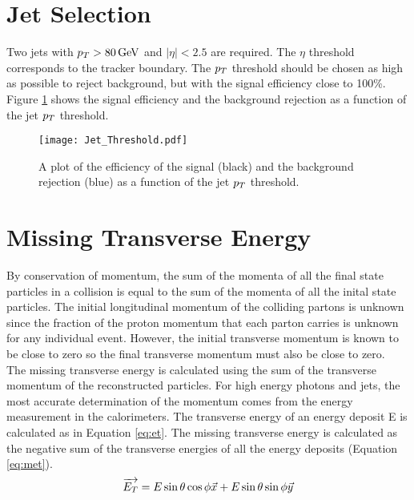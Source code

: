 \section{Jet Selection}

Two jets with $p_{T} > 80 \, \mathrm{GeV}$ and $|\eta| < 2.5$ are required. The $\eta$
threshold corresponds to the tracker boundary. The $p_{T}$ threshold should be
chosen as high as possible to reject background, but with the signal efficiency
close to 100\%. Figure \ref{fig:Jet_Threshold} shows the signal efficiency and 
the background rejection as a function of the jet $p_{T}$ threshold. 

\begin{figure}
\begin{center}
\texttt{[image: Jet\_Threshold.pdf]}
\end{center}
\caption{A plot of the efficiency of the signal (black) and the background
rejection (blue) as a function of the jet $p_{T}$ threshold.}
\label{fig:Jet_Threshold}
\end{figure}

\section{Missing Transverse Energy}
\label{sec:Missing_Transverse_Energy}

By conservation of momentum, the sum of the momenta of all the final state
particles in a collision is equal to the sum of the momenta of all the inital
state particles. The initial longitudinal momentum of the colliding partons is
unknown since the fraction of the proton momentum that each parton carries is
unknown for any individual event. However, the initial transverse momentum is
known to be close to zero so the final transverse momentum must also be close to 
zero. \\

The missing transverse energy is calculated using the sum of the transverse
momentum of the reconstructed particles. For high energy photons and jets, the 
most accurate determination of the momentum comes from the energy measurement in
the calorimeters. The transverse energy of an energy deposit E is calculated as 
in Equation \ref{eq:et}. The missing transverse energy is calculated as the
negative sum of the transverse energies of all the energy deposits (Equation
\ref{eq:met}). \\

\begin{equation}
\overrightarrow{E_{T}} = E\sin{\theta}\cos{\phi}\vec{x} + E\sin{\theta}\sin{\phi}\vec{y}
\label{eq:et}
\end{equation}

